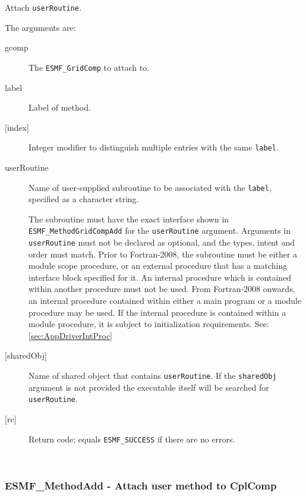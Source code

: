    Attach {\tt userRoutine}.
  
   The arguments are:
   \begin{description}
   \item[gcomp]
     The {\tt ESMF\_GridComp} to attach to.
   \item[label]
     Label of method.
   \item[{[index]}]
     Integer modifier to distinguish multiple entries with the same {\tt label}.
   \item[userRoutine]
     Name of user-supplied subroutine to be associated with the {\tt label},
     specified as a character string.
  
     The subroutine must have the exact interface shown in {\tt ESMF\_MethodGridCompAdd}
     for the {\tt userRoutine} argument. Arguments in {\tt userRoutine}
     must not be declared as optional, and the types, intent and order must
     match.
     Prior to Fortran-2008, the subroutine must be either a module scope procedure,
     or an external procedure that has a matching interface block specified for it.
     An internal procedure which is contained within another procedure must not be used.
     From Fortran-2008 onwards, an internal procedure contained within either a main program
     or a module procedure may be used.  If the internal procedure is contained within a
     module procedure, it is subject to initialization requirements.  See: \ref{sec:AppDriverIntProc}
   \item[{[sharedObj]}]
     Name of shared object that contains {\tt userRoutine}. If the
     {\tt sharedObj} argument is not provided the executable itself will be
     searched for {\tt userRoutine}.
   \item[{[rc]}]
     Return code; equals {\tt ESMF\_SUCCESS} if there are no errors.
   \end{description}
   
 
\mbox{}\hrulefill\ 
 
\subsubsection [ESMF\_MethodAdd] {ESMF\_MethodAdd - Attach user method to CplComp}


